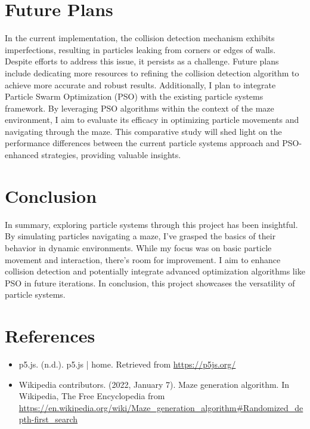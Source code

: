 \documentclass{article}
\begin{document}
\section{Future Plans}
In the current implementation, the collision detection mechanism exhibits imperfections, resulting in particles leaking from corners or edges of walls. Despite efforts to address this issue, it persists as a challenge. Future plans include dedicating more resources to refining the collision detection algorithm to achieve more accurate and robust results. 
Additionally, I plan to integrate Particle Swarm Optimization (PSO) with the existing particle systems framework. By leveraging PSO algorithms within the context of the maze environment, I aim to evaluate its efficacy in optimizing particle movements and navigating through the maze. This comparative study will shed light on the performance differences between the current particle systems approach and PSO-enhanced strategies, providing valuable insights.

\section{Conclusion}
In summary, exploring particle systems through this project has been insightful. By simulating particles navigating a maze, I've grasped the basics of their behavior in dynamic environments. While my focus was on basic particle movement and interaction, there's room for improvement. I aim to enhance collision detection and potentially integrate advanced optimization algorithms like PSO in future iterations. In conclusion, this project showcases the versatility of particle systems.
\section{References}
\begin{itemize}
    \item p5.js. (n.d.). p5.js | home. Retrieved from \url{https://p5js.org/}
    \item Wikipedia contributors. (2022, January 7). Maze generation algorithm. In Wikipedia, The Free Encyclopedia from \url{https://en.wikipedia.org/wiki/Maze_generation_algorithm#Randomized_depth-first_search}
\end{itemize}
\end{document}
